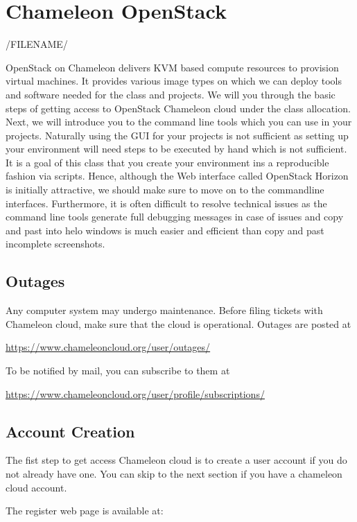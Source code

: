 \section{Chameleon OpenStack}
\label{s:chameleon-openstack}

/FILENAME/

OpenStack on Chameleon delivers KVM based compute resources to
provision virtual machines. It provides various image types on
which we can deploy tools and software needed for the class and
projects. We will you through the basic steps of getting access to
OpenStack Chameleon cloud under the class allocation. Next, we will
introduce you to the command line tools which you can use in your
projects. Naturally using the GUI for your projects is not sufficient
as setting up your environment will need steps to be executed by hand
which is not sufficient. It is a goal of this class that you create
your environment ins a reproducible fashion via scripts.  Hence,
although the Web interface called OpenStack Horizon is initially
attractive, we should make sure to move on to the commandline
interfaces.  Furthermore, it is often difficult to resolve technical
issues as the command line tools generate full debugging messages in
case of issues and copy and past into helo windows is much easier and
efficient than copy and past incomplete screenshots.


\subsection{Outages}

Any computer system may undergo maintenance. Before filing tickets
with Chameleon cloud, make sure that the cloud is operational. Outages
are posted at 

\url{https://www.chameleoncloud.org/user/outages/}

To be notified by mail, you can subscribe to them at 

\url{https://www.chameleoncloud.org/user/profile/subscriptions/}

\subsection{Account Creation}

The fist step to get access Chameleon cloud is to create a user
account if you do not already have one. You can skip to the next
section if you have a chameleon cloud account.

The register web page is available at:

